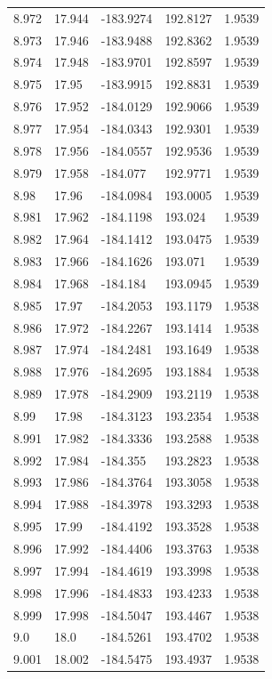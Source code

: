 \begin{tabular}{lllll}
8.972 & 17.944 & -183.9274 & 192.8127 & 1.9539 \\
8.973 & 17.946 & -183.9488 & 192.8362 & 1.9539 \\
8.974 & 17.948 & -183.9701 & 192.8597 & 1.9539 \\
8.975 & 17.95 & -183.9915 & 192.8831 & 1.9539 \\
8.976 & 17.952 & -184.0129 & 192.9066 & 1.9539 \\
8.977 & 17.954 & -184.0343 & 192.9301 & 1.9539 \\
8.978 & 17.956 & -184.0557 & 192.9536 & 1.9539 \\
8.979 & 17.958 & -184.077 & 192.9771 & 1.9539 \\
8.98 & 17.96 & -184.0984 & 193.0005 & 1.9539 \\
8.981 & 17.962 & -184.1198 & 193.024 & 1.9539 \\
8.982 & 17.964 & -184.1412 & 193.0475 & 1.9539 \\
8.983 & 17.966 & -184.1626 & 193.071 & 1.9539 \\
8.984 & 17.968 & -184.184 & 193.0945 & 1.9539 \\
8.985 & 17.97 & -184.2053 & 193.1179 & 1.9538 \\
8.986 & 17.972 & -184.2267 & 193.1414 & 1.9538 \\
8.987 & 17.974 & -184.2481 & 193.1649 & 1.9538 \\
8.988 & 17.976 & -184.2695 & 193.1884 & 1.9538 \\
8.989 & 17.978 & -184.2909 & 193.2119 & 1.9538 \\
8.99 & 17.98 & -184.3123 & 193.2354 & 1.9538 \\
8.991 & 17.982 & -184.3336 & 193.2588 & 1.9538 \\
8.992 & 17.984 & -184.355 & 193.2823 & 1.9538 \\
8.993 & 17.986 & -184.3764 & 193.3058 & 1.9538 \\
8.994 & 17.988 & -184.3978 & 193.3293 & 1.9538 \\
8.995 & 17.99 & -184.4192 & 193.3528 & 1.9538 \\
8.996 & 17.992 & -184.4406 & 193.3763 & 1.9538 \\
8.997 & 17.994 & -184.4619 & 193.3998 & 1.9538 \\
8.998 & 17.996 & -184.4833 & 193.4233 & 1.9538 \\
8.999 & 17.998 & -184.5047 & 193.4467 & 1.9538 \\
9.0 & 18.0 & -184.5261 & 193.4702 & 1.9538 \\
9.001 & 18.002 & -184.5475 & 193.4937 & 1.9538 \\

\end{tabular}
